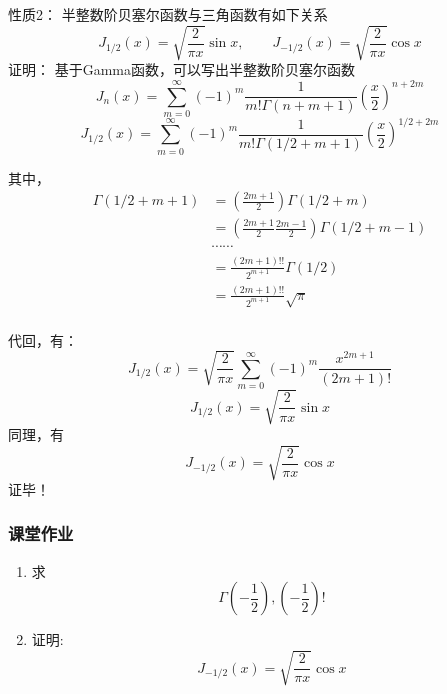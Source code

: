 \begin{frame}
	\alert{性质2：} 半整数阶贝塞尔函数与三角函数有如下关系
	\begin{equation*}
		J_{1/2} (x) =\sqrt{\frac{2}{\pi x}} \sin x,  \qquad  J_{-1/2} (x) =\sqrt{\frac{2}{\pi x}} \cos x
	\end{equation*}	
	\alert{证明：}  基于Gamma函数，可以写出半整数阶贝塞尔函数
	\begin{equation*}
		J_n(x) = \sum\limits_{m=0}^{\infty} (-1)^m  \frac{1}{m! \Gamma(n+m+1) } (\frac{x}{2})^{n+2m} 
	\end{equation*}	
	\begin{equation*}
		J_{1/2}(x) = \sum\limits_{m=0}^{\infty} (-1)^m  \frac{1}{m! \Gamma(1/2+m+1) } (\frac{x}{2})^{1/2+2m} 
	\end{equation*}	
\end{frame}	

\begin{frame}
	其中， 
	\begin{equation*}
		\begin{split}
			\Gamma(1/2+m+1) &= (\frac{2m+1}{2}) \Gamma(1/2+m) \\
			& = (\frac{2m+1}{2}\frac{2m-1}{2})  \Gamma(1/2+m-1) \\
			&\cdots \cdots \\
			& = \frac{(2m+1)!!}{2^{m+1}} \Gamma(1/2) \\
			& = \frac{(2m+1)!!}{2^{m+1}} \sqrt{\pi} \\
		\end{split}	
	\end{equation*}	
\end{frame}	

\begin{frame}
	代回，有：
	\begin{equation*}
		J_{1/2}(x) = \sqrt{\frac{2}{\pi x}} \sum\limits_{m=0}^{\infty} (-1)^m  \frac{x^{2m+1}}{(2m+1)!} 
	\end{equation*}	 
	\begin{equation*}
		J_{1/2}(x) = \sqrt{\frac{2}{\pi x}} \sin x  
	\end{equation*}	 
	同理，有 
	\begin{equation*}
		J_{-1/2}(x) = \sqrt{\frac{2}{\pi x}} \cos x  
	\end{equation*}	 
	\alert{证毕！} 
\end{frame}

\begin{frame}
	\frametitle{课堂作业}
	\begin{enumerate}
		\item 求 \[\Gamma(-\frac{1}{2}), (-\frac{1}{2}) !\]
		\item 证明: \[ J_{-1/2}(x) = \sqrt{\frac{2}{\pi x}} \cos x \]
	\end{enumerate}
\end{frame}

